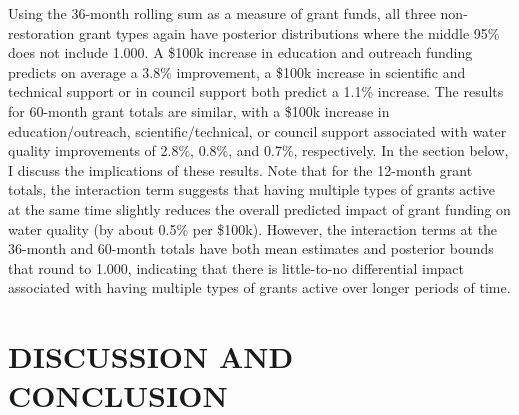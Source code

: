 \documentclass[12pt,a4paper,titlepage]{article}
\begin{document}


Using the 36-month rolling sum as a measure of grant funds, all three non-restoration grant types again have posterior distributions where the middle 95\% does not include 1.000. A \$100k increase in education and outreach funding predicts on average a 3.8\% improvement, a \$100k increase in scientific and technical support or in council support both predict a 1.1\% increase. The results for 60-month grant totals are similar, with a \$100k increase in education/outreach, scientific/technical, or council support associated with water quality improvements of 2.8\%, 0.8\%, and 0.7\%, respectively. In the section below, I discuss the implications of these results. Note that for the 12-month grant totals, the interaction term suggests that having multiple types of grants active at the same time slightly reduces the overall predicted impact of grant funding on water quality (by about 0.5\% per \$100k). However, the interaction terms at the 36-month and 60-month totals have both mean estimates and posterior bounds that round to 1.000, indicating that there is little-to-no differential impact associated with having multiple types of grants active over longer periods of time.



\section*{\bf\MakeUppercase{Discussion and Conclusion}}
\end{document}
